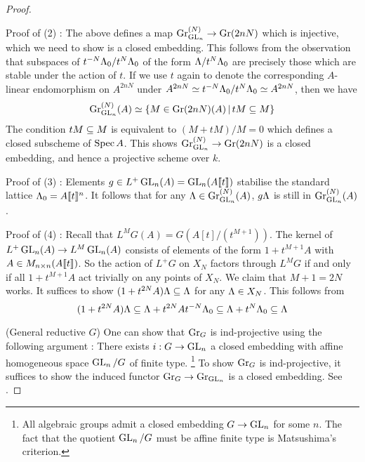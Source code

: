 \documentclass{article}
\begin{document}
\begin{proof}
\begin{itemize}
  \end{itemize}

  Proof of (2) :
  The above defines a map $\operatorname{Gr}_{\operatorname{GL}_n}^{(N)} \to \operatorname{Gr}(2nN)$
  which is injective,
  which we need to show is a closed embedding.
  This follows from the observation that subspaces of $t^{-N}\Lambda_0 / t^N\Lambda_0$ 
  of the form $\Lambda / t^N \Lambda_0$ are precisely those
  which are stable under the action of $t$.
  If we use $t$ again to denote the corresponding 
  $A$-linear endomorphism on $A^{2nN}$ 
  under $A^{2nN} \simeq t^{-N}\Lambda_0 / t^N\Lambda_0 \simeq A^{2nN}$,
  then we have
  \[
    \operatorname{Gr}_{\operatorname{GL}_n}^{(N)}(A) \simeq \left\{M \in \operatorname{Gr}(2nN)(A) \,|\, t M \subseteq M\right\}
  \]
  The condition $tM \subseteq M$ is equivalent to $(M + t M) / M = 0$
  which defines a closed subscheme of $\operatorname{Spec} A$.
  This shows $\operatorname{Gr}_{\operatorname{GL}_n}^{(N)} \to \operatorname{Gr}(2nN)$ is a closed embedding,
  and hence a projective scheme over $k$.

  Proof of (3) :
  Elements $g \in L^+\operatorname{GL}_n(A) = \operatorname{GL}_n(A\llbracket t \rrbracket)$ stabilise 
  the standard lattice $\Lambda_0 = A\llbracket t \rrbracket^n$.
  It follows that for any $\Lambda \in \operatorname{Gr}_{\operatorname{GL}_n}^{(N)}(A)$, 
  $g \Lambda$ is still in $\operatorname{Gr}_{\operatorname{GL}_n}^{(N)}(A)$.

  Proof of (4) :
  Recall that $L^M G(A) = G (A[t] / (t^{M+1}))$.
  The kernel of $L^+ \operatorname{GL}_n (A)\to L^M \operatorname{GL}_n (A)$ consists of
  elements of the form $1 + t^{M + 1} A$ with 
  $A \in M_{n \times n}(A\llbracket t \rrbracket)$.
  So the action of $L^+ G$ on $X_N$ factors through $L^M G$
  if and only if all $1 + t^{M + 1} A$ act trivially on 
  any points of $X_N$.
  We claim that $M + 1 = 2N$ works.
  It suffices to show $(1 + t^{2N}A) \Lambda \subseteq \Lambda$ for
  any $\Lambda \in X_N$.
  This follows from 
  \[
    (1 + t^{2N} A) \Lambda \subseteq \Lambda + t^{2 N} A t^{-N} \Lambda_0
    \subseteq \Lambda + t^{N} \Lambda_0 \subseteq \Lambda
  \]

  (General reductive $G$)
  One can show that $\operatorname{Gr}_G$ is ind-projective using the following argument :
  There exists $i : G \to \operatorname{GL}_n$ a closed embedding with
  affine homogeneous space $\operatorname{GL}_n / G$ of finite type.
  \footnote{
      All algebraic groups admit a closed embedding
      $G \to \operatorname{GL}_n$ for some $n$.
      \cite[Theorem 4.8]{milne}
      The fact that the quotient $\operatorname{GL}_n / G$ must be affine finite type
      is Matsushima's criterion.
  }
  To show $\operatorname{Gr}_G$ is ind-projective,
  it suffices to show the induced functor $\operatorname{Gr}_G \to \operatorname{Gr}_{\operatorname{GL}_n}$
  is a closed embedding.
  See .
  
\end{proof}
\end{document}
